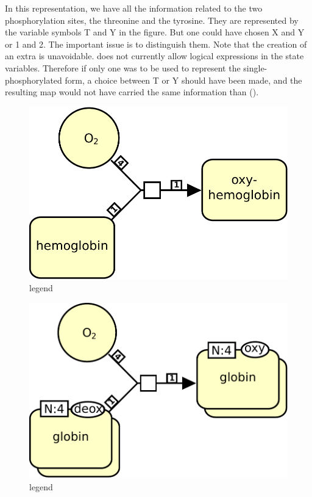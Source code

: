 In this representation, we have all the information related to the two phosphorylation sites, the threonine and the tyrosine. They are represented by the variable symbols T and Y in the figure. But one could have chosen X and Y or 1 and 2. The important issue is to distinguish them. Note that the creation of an extra  is unavoidable. \SBGNPDLone does not currently allow logical expressions in the state variables. Therefore if only one  was to be used to represent the single-phosphorylated form, a choice between T or Y should have been made, and the resulting map would not have carried the same information than  ().


\begin{figure}[H]
  \centering
  \includegraphics[scale = 0.4]{images/hemoglobin-macromolecule}
  \caption{legend}
  \label{fig:hemoglobin-macromolecule}
\end{figure}

\begin{figure}[H]
  \centering
  \includegraphics[scale = 0.4]{images/hemoglobin-multimer}
  \caption{legend}
  \label{fig:hemoglobin-multimer}
\end{figure}

